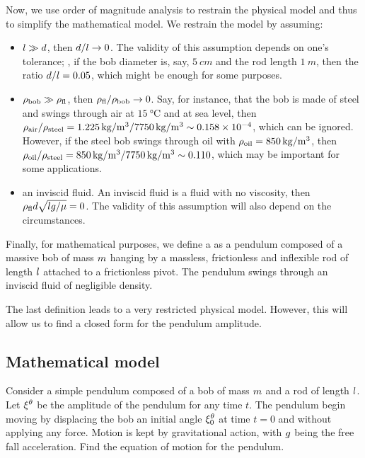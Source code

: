 Now, we use order of magnitude analysis to restrain the physical model and thus to simplify the mathematical model. We restrain the model by assuming:
\begin{itemize}
\item $l\gg d$, then $d/l\to 0$. The validity of this assumption depends on one's tolerance; \eg, if the bob diameter is, say, $\SI{5}{cm}$ and the rod length $\SI{1}{m}$, then the ratio $d/l = 0.05$, which might be enough for some purposes.
%
\item $\rho_\text{bob}\gg\rho_\text{fl}$, then $\rho_\text{fl}/\rho_\text{bob}\to 0$. Say, for instance, that the bob is made of steel and swings through air at $\SI{15}{\celsius}$ and at sea level, then $\rho_\text{air}/\rho_\text{steel} = \SI{1.225}{kg/m^3}/\SI{7750}{kg/m^3} \sim \num{0.158e-4}$, which can be ignored. However, if the steel bob swings through oil with $\rho_\text{oil} = \SI{850}{kg/m^3}$, then $\rho_\text{oil}/\rho_\text{steel} = \SI{850}{kg/m^3}/\SI{7750}{kg/m^3} \sim \num{0.110}$, which may be important for some applications.
%
\item an inviscid fluid. An inviscid fluid is a fluid with no viscosity, then $\rho_\text{fl}d\sqrt{lg/\mu} = 0$. The validity of this assumption will also depend on the circumstances.
\end{itemize}

Finally, for mathematical purposes, we define a  as a pendulum composed of a massive bob of mass $m$ hanging by a massless, frictionless and inflexible rod of length $l$ attached to a frictionless pivot. The pendulum swings through an inviscid fluid of negligible density.

The last definition leads to a very restricted physical model. However, this will allow us to find a closed form for the pendulum amplitude.


\subsection{Mathematical model}
Consider a simple pendulum composed of a bob of mass $m$ and a rod of length $l$. Let ${\xi}^{\theta}$ be the amplitude of the pendulum for any time $t$. The pendulum begin moving by displacing the bob an initial angle ${\xi}^{\theta}_0$ at time $t = 0$ and without applying any force. Motion is kept by gravitational action, with $g$ being the free fall acceleration. Find the equation of motion for the pendulum.

